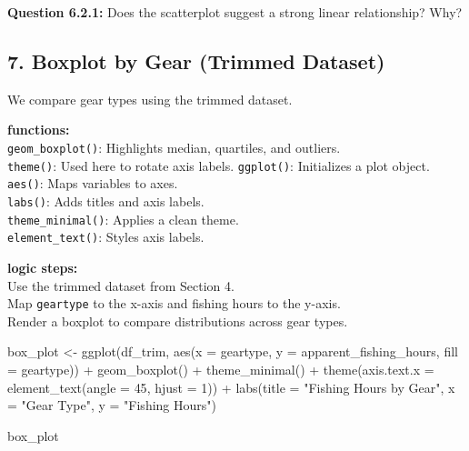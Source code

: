 \documentclass[
]{article}
\newenvironment{Shaded}{\begin{snugshade}}{\end{snugshade}}
\newcommand{\AttributeTok}[1]{\textcolor[rgb]{0.77,0.63,0.00}{#1}}
\newcommand{\DecValTok}[1]{\textcolor[rgb]{0.00,0.00,0.81}{#1}}
\newcommand{\FunctionTok}[1]{\textcolor[rgb]{0.00,0.00,0.00}{#1}}
\newcommand{\NormalTok}[1]{#1}
\newcommand{\OtherTok}[1]{\textcolor[rgb]{0.56,0.35,0.01}{#1}}
\newcommand{\SpecialCharTok}[1]{\textcolor[rgb]{0.00,0.00,0.00}{#1}}
\newcommand{\StringTok}[1]{\textcolor[rgb]{0.31,0.60,0.02}{#1}}
\begin{document}
\textbf{Question 6.2.1:} Does the scatterplot suggest a strong linear
relationship? Why?

\hypertarget{boxplot-by-gear-trimmed-dataset}{%
\subsection{7. Boxplot by Gear (Trimmed
Dataset)}\label{boxplot-by-gear-trimmed-dataset}}

We compare gear types using the trimmed dataset.

\textbf{functions:}\\
\texttt{geom\_boxplot()}: Highlights median, quartiles, and outliers.\\
\texttt{theme()}: Used here to rotate axis labels. \texttt{ggplot()}:
Initializes a plot object.\\
\texttt{aes()}: Maps variables to axes.\\
\texttt{labs()}: Adds titles and axis labels.\\
\texttt{theme\_minimal()}: Applies a clean theme.\\
\texttt{element\_text()}: Styles axis labels.

\textbf{logic steps:}\\
Use the trimmed dataset from Section 4.\\
Map \texttt{geartype} to the x-axis and fishing hours to the y-axis.\\
Render a boxplot to compare distributions across gear types.

\begin{Shaded}
\begin{Highlighting}[]
\NormalTok{box\_plot }\OtherTok{\textless{}{-}} \FunctionTok{ggplot}\NormalTok{(df\_trim, }\FunctionTok{aes}\NormalTok{(}\AttributeTok{x =}\NormalTok{ geartype, }\AttributeTok{y =}\NormalTok{ apparent\_fishing\_hours, }\AttributeTok{fill =}\NormalTok{ geartype)) }\SpecialCharTok{+}
  \FunctionTok{geom\_boxplot}\NormalTok{() }\SpecialCharTok{+}
  \FunctionTok{theme\_minimal}\NormalTok{() }\SpecialCharTok{+}
  \FunctionTok{theme}\NormalTok{(}\AttributeTok{axis.text.x =} \FunctionTok{element\_text}\NormalTok{(}\AttributeTok{angle =} \DecValTok{45}\NormalTok{, }\AttributeTok{hjust =} \DecValTok{1}\NormalTok{)) }\SpecialCharTok{+}
  \FunctionTok{labs}\NormalTok{(}\AttributeTok{title =} \StringTok{"Fishing Hours by Gear"}\NormalTok{, }\AttributeTok{x =} \StringTok{"Gear Type"}\NormalTok{, }\AttributeTok{y =} \StringTok{"Fishing Hours"}\NormalTok{)}

\NormalTok{box\_plot}
\end{Highlighting}
\end{Shaded}
\end{document}
